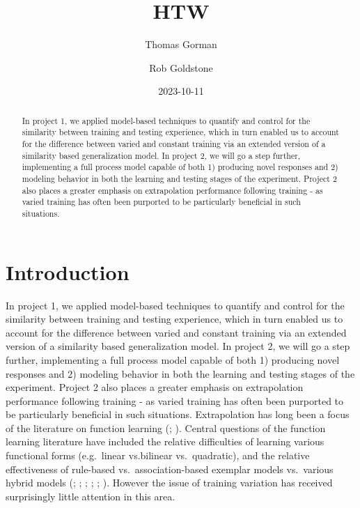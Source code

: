 \documentclass[
  letterpaper,
  DIV=11,
  numbers=noendperiod,
  oneside]{scrartcl}
\title{HTW}
\author{Thomas Gorman \and Rob Goldstone}
\date{2023-10-11}
\renewcommand*\contentsname{Table of contents}
\newcommand\contentsname{Table of contents}
\begin{document}
\maketitle
\begin{abstract}
In project 1, we applied model-based techniques to quantify and control
for the similarity between training and testing experience, which in
turn enabled us to account for the difference between varied and
constant training via an extended version of a similarity based
generalization model. In project 2, we will go a step further,
implementing a full process model capable of both 1) producing novel
responses and 2) modeling behavior in both the learning and testing
stages of the experiment. Project 2 also places a greater emphasis on
extrapolation performance following training - as varied training has
often been purported to be particularly beneficial in such situations.
\end{abstract}
\renewcommand*\contentsname{Table of contents}
{
\hypersetup{linkcolor=}
\setcounter{tocdepth}{3}
\tableofcontents
}
\section{Introduction}\label{introduction}

In project 1, we applied model-based techniques to quantify and control
for the similarity between training and testing experience, which in
turn enabled us to account for the difference between varied and
constant training via an extended version of a similarity based
generalization model. In project 2, we will go a step further,
implementing a full process model capable of both 1) producing novel
responses and 2) modeling behavior in both the learning and testing
stages of the experiment. Project 2 also places a greater emphasis on
extrapolation performance following training - as varied training has
often been purported to be particularly beneficial in such situations.
Extrapolation has long been a focus of the literature on function
learning (; ). Central questions of the function learning literature have
included the relative difficulties of learning various functional forms
(e.g.~linear vs.bilinear vs.~quadratic), and the relative effectiveness
of rule-based vs.~association-based exemplar models vs.~various hybrid
models (; ; ; ; ;
). However the issue of training variation has received
surprisingly little attention in this area.
\end{document}
